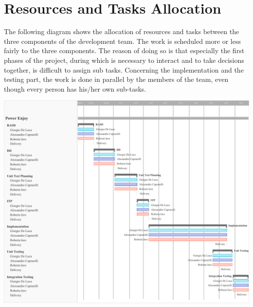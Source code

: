 \chapter{Resources and Tasks Allocation}
The following diagram shows the allocation of resources and tasks between the three components of the development team.
The work is scheduled more or less fairly to the three components.
The reason of doing so is that especially the first phases of the project, during which is necessary to interact and to take decisions together, is difficult to assign sub tasks.
Concerning the implementation and the testing part, the work is done in parallel by the members of the team, even though every person has his/her own sub-tasks.

\begin{minipage}{\textwidth}
\includegraphics[width=\linewidth, keepaspectratio]{../images/resource.pdf}
\end{minipage}

